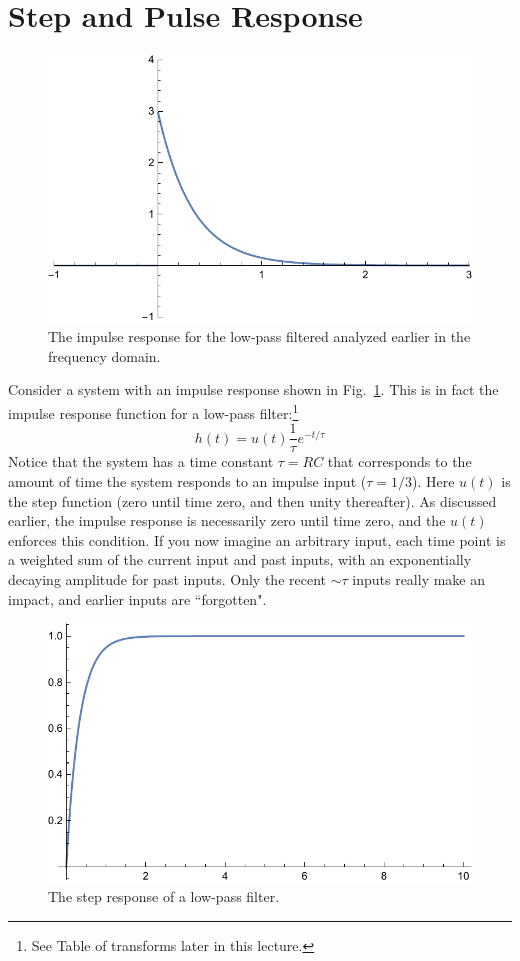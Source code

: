 \section{Step and Pulse Response}
\begin{figure}[tb]
\centering
\includegraphics[width=.6\columnwidth]{impulse_resp}
\caption{The impulse response for the low-pass filtered analyzed earlier in the frequency domain. }
\label{fig:impulse_resp}
\end{figure}
Consider a system with an impulse response shown in Fig.~\ref{fig:impulse_resp}.  This is in fact the impulse response function for a low-pass filter:\footnote{See Table of transforms later in this lecture.}
    \begin{equation}
        h(t) = u(t) \frac{1}{\tau} e^{-t/\tau}
    \end{equation}
Notice that the system has a time constant $\tau = RC$ that corresponds to the amount of time the system responds to an impulse input ($\tau = 1/3$).  Here $u(t)$ is the step function (zero until time zero, and then unity thereafter).  As discussed earlier, the impulse response is necessarily zero until time zero, and the $u(t)$ enforces this condition.  If you now imagine an arbitrary input, each time point is a weighted sum of the current input and past inputs, with an exponentially decaying amplitude for past inputs.  Only the recent $\sim \tau$ inputs really make an impact, and earlier inputs are ``forgotten".  
\begin{figure}[tb]
\centering
\includegraphics[width=.5\columnwidth]{step_resp}
\caption{The step response of a low-pass filter. }
\label{fig:step_resp}
\end{figure}
